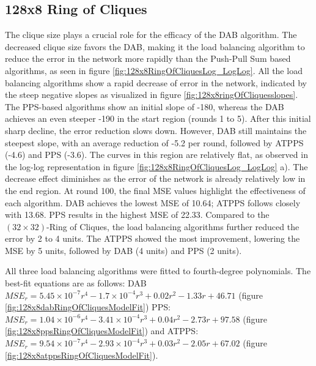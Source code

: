 \subsection{128x8 Ring of Cliques}\label{subsec:128_8ROC}
The clique size plays a crucial role for the efficacy of the DAB algorithm. The decreased clique size favors the DAB, making it the load balancing algorithm to reduce the error in the network more rapidly than the Push-Pull Sum based algorithms, as seen in figure \ref{fig:128x8RingOfCliquesLog_LogLog}. All the load balancing algorithms show a rapid decrease of error in the network, indicated by the steep negative slopes as visualized in figure \ref{fig:128x8ringOfCliquesslopes}. The PPS-based algorithms show an initial slope of -180, whereas the DAB achieves an even steeper -190 in the start region (rounds 1 to 5). After this initial sharp decline, the error reduction slows down. However, DAB still maintains the steepest slope, with an average reduction of -5.2 per round, followed by ATPPS (-4.6) and PPS (-3.6). The curves in this region are relatively flat, as observed in the log-log representation in figure \ref{fig:128x8RingOfCliquesLog_LogLog} a). The decrease effect diminishes as the error of the network is already relatively low in the end region. At round 100, the final MSE values highlight the effectiveness of each algorithm. DAB achieves the lowest MSE of 10.64; ATPPS follows closely with 13.68. PPS results in the highest MSE of 22.33. Compared to the $(32 \times 32)$-Ring of Cliques, the load balancing algorithms further reduced the error by 2 to 4 units. The ATPPS showed the most improvement, lowering the MSE by 5 units, followed by DAB (4 units) and PPS (2 units).

All three load balancing algorithms were fitted to fourth-degree polynomials. The best-fit equations are as follows: DAB $MSE_r=5.45\times 10 ^{-7}r^{4}-1.7\times 10^{-4}r^{3}+0.02r^{2}-1.33r+46.71$ (figure \ref{fig:128x8dabRingOfCliquesModelFit}) PPS: $MSE_r=1.04\times 10 ^{-6}r^{4}-3.41\times 10^{-4}r^{3}+0.04r^{2}-2.73r+97.58$ (figure \ref{fig:128x8ppsRingOfCliquesModelFit}) and ATPPS: $MSE_r=9.54\times 10^{-7}r^{4}-2.93\times 10^{-4}r^{3}+0.03r^{2}-2.05r+67.02$ (figure \ref{fig:128x8atppsRingOfCliquesModelFit}).

